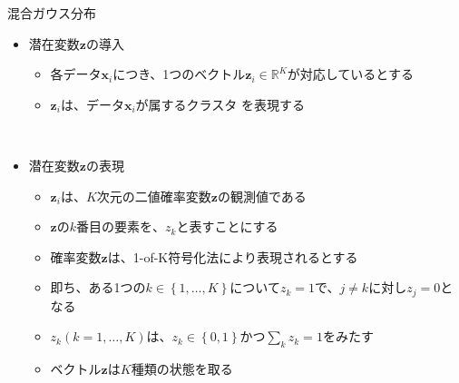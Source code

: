 \documentclass[dvipdfmx,notheorems,t]{beamer}
\begin{document}
\begin{frame}{混合ガウス分布}

\begin{itemize}
	\item 潜在変数$\bm{z}$の導入
	\begin{itemize}
		\item 各データ$\bm{x}_i$につき、1つのベクトル$\bm{z}_i \in \mathbb{R}^K$が対応しているとする
		\item $\bm{z}_i$は、\color{red}データ$\bm{x}_i$が属するクラスタ \normalcolor を表現する
	\end{itemize} \
	
	\item 潜在変数$\bm{z}$の表現
	\begin{itemize}
		\item $\bm{z}_i$は、$K$次元の二値確率変数$\bm{z}$の観測値である
		\item $\bm{z}$の$k$番目の要素を、$z_k$と表すことにする
		\newline
		\item 確率変数$\bm{z}$は、\alert{1-of-K符号化法}により表現されるとする
		\item 即ち、ある1つの$k \in \left\{ 1, \ldots, K \right\}$について$z_k = 1$で、$j \neq k$に対し$z_j = 0$となる
		\item $z_k (k = 1, \ldots, K)$は、$z_k \in \left\{ 0, 1 \right\}$かつ$\sum_k z_k = 1$をみたす
		\newline
		\item ベクトル$\bm{z}$は$K$種類の状態を取る
	\end{itemize}
\end{itemize}

\end{frame}
\end{document}
